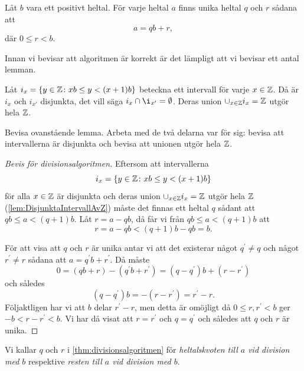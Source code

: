 \begin{theorem}[Divisionsalgoritmen]\label{thm:divisionsalgoritmen}
  Låt \(b\) vara ett positivt heltal.
  För varje heltal \(a\) finns unika heltal \(q\) och \(r\) sådana att \[a = qb 
  + r,\] där \(0\leq r < b\).
\end{theorem}

Innan vi bevisar att algoritmen är korrekt är det lämpligt att vi bevisar ett 
antal lemman.

\begin{lemma}\label{lem:DisjunktaIntervallAvZ}
  Låt \( i_x = \{y\in\mathbb{Z} \colon xb\leq y < (x + 1)b\} \) beteckna ett intervall 
  för varje \(x\in\mathbb{Z}\).
  Då är \(i_x\) och \(i_{x'}\) disjunkta, det vill säga \(i_x\cap \i_{x'} = 
    \emptyset\).
  Deras union \(\cup_{x\in \mathbb{Z}} i_x = \mathbb{Z}\) utgör hela \(\mathbb{Z}\).
\end{lemma}
\begin{exercise}
  Bevisa ovanstående lemma.
  Arbeta med de två delarna var för sig: bevisa att intervallerna är disjunkta 
  och bevisa att unionen utgör hela \(\mathbb{Z}\).
\end{exercise}

\begin{proof}[Bevis för divisionsalgoritmen]
  Eftersom att intervallerna \[
    i_x = \{y\in\mathbb{Z} \colon xb\leq y < (x + 1)b\}
  \] för alla \(x\in\mathbb{Z}\) är disjunkta och deras union \(\cup_{x\in \mathbb{Z}} i_x = 
    \mathbb{Z}\) utgör hela \(\mathbb{Z}\) (\cref{lem:DisjunktaIntervallAvZ}) måste det finnas 
  ett heltal \(q\) sådant att \(qb\leq a < (q+1)b\).
  Låt \(r = a - qb\), då får vi från \(qb\leq a < (q + 1)b\) att \[ r = a - qb 
  < (q + 1)b - qb = b.\]

  För att visa att \(q\) och \(r\) är unika antar vi att det existerar något 
  \(q^\prime\neq q\) och något \(r^\prime\neq r\) sådana att \(a = q^\prime 
  b + r^\prime\).
  Då måste \[0 = (qb + r) - (q^\prime b + r^\prime) = (q - q^\prime)b + (r 
  - r^\prime)\] och således \[ (q - q^\prime)b = -(r - r^\prime) = r^\prime 
  - r.\]
  Följaktligen har vi att \(b\) delar \(r^\prime - r\), men detta är omöjligt 
  då \(0\leq r, r^\prime < b\) ger \(-b < r - r^\prime < b\).
  Vi har då visat att \(r = r^\prime\) och \(q = q^\prime\) och således att 
  \(q\) och \(r\) är unika.
\end{proof}

\begin{definition}
  Vi kallar \(q\) och \(r\) i \cref{thm:divisionsalgoritmen} för
  \emph{heltalskvoten till \(a\) vid division med \(b\)} respektive
  \emph{resten till \(a\) vid division med \(b\)}.
\end{definition}


